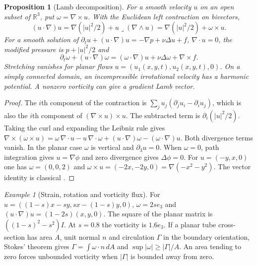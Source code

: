 \documentclass[aps,pra,onecolumn,superscriptaddress,nofootinbib,10pt]{revtex4-2}
\newtheorem{proposition}[theorem]{Proposition}
\theoremstyle{definition}
\theoremstyle{remark}
\newtheorem{example}[theorem]{Example}
\begin{document}
\begin{proposition}[Lamb decomposition]
\label{ob:lamb}
For a smooth velocity $u$ on an open subset of $\mathbb R^3$, put
$\omega=\nabla\times u$. With the Euclidean left contraction on bivectors,
\[
 (u\cdot\nabla)u
 =\nabla(|u|^2/2)+u\mathbin{\lrcorner}(\nabla\wedge u)
 =\nabla(|u|^2/2)+\omega\times u.
\]
For a smooth solution of
$\partial_t u+(u\cdot\nabla)u=-\nabla p+\nu\Delta u+f$, $\nabla\cdot u=0$,
the modified pressure is $p+|u|^2/2$ and
\[
 \partial_t\omega+(u\cdot\nabla)\omega
 =(\omega\cdot\nabla)u+\nu\Delta\omega+\nabla\times f .
\]
Stretching vanishes for planar flows $u=(u_1(x,y,t),u_2(x,y,t),0)$.
On a simply connected domain, an incompressible irrotational velocity
has a harmonic potential. A nonzero vorticity can give a gradient Lamb vector.
\end{proposition}
\begin{proof}
The $i$th component of the contraction is
$\sum_j u_j(\partial_j u_i-\partial_i u_j)$, which is also the
$i$th component of $(\nabla\times u)\times u$. The subtracted term
is $\partial_i(|u|^2/2)$. Taking the curl and expanding the Leibniz rule gives
$\nabla\times(\omega\times u)
=\omega\,\nabla\cdot u-u\,\nabla\cdot\omega
 +(u\cdot\nabla)\omega-(\omega\cdot\nabla)u$.
Both divergence terms vanish. In the planar case $\omega$ is vertical and
$\partial_3u=0$. When $\omega=0$, path integration gives $u=\nabla\phi$
and zero divergence gives $\Delta\phi=0$.
For $u=(-y,x,0)$ one has $\omega=(0,0,2)$ and
$\omega\times u=(-2x,-2y,0)=\nabla(-x^2-y^2)$.
The vector identity is classical \cite{obr:Lamb}.
\end{proof}

\begin{example}[Strain, rotation and vorticity flux]
\label{ob:vortexflux}
For $u=((1-s)x-sy,sx-(1-s)y,0)$,
$\omega=2s e_3$ and $(u\cdot\nabla)u=(1-2s)(x,y,0)$.
The square of the planar matrix is $((1-s)^2-s^2)I$.
At $s=0.8$ the vorticity is $1.6 e_3$.
If a planar tube cross-section has area $A$, unit normal $n$ and
circulation $\Gamma$ in the boundary orientation, Stokes' theorem gives
$\Gamma=\int\omega\cdot n\,dA$ and $\sup|\omega|\ge|\Gamma|/A$.
An area tending to zero forces unbounded vorticity when $|\Gamma|$
is bounded away from zero.
\end{example}
\end{document}
